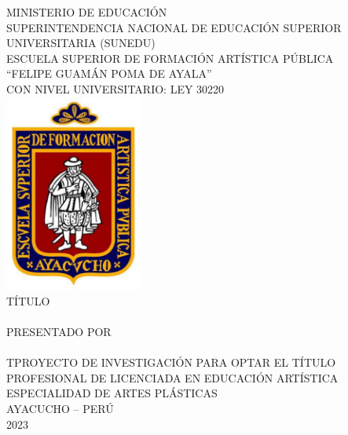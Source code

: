 \documentclass[12pt,a4paper]{article}
\begin{document}
\setlength{\abovecaptionskip}{0pt}
\setlength{\belowcaptionskip}{0pt}
  
\thispagestyle{empty}

{
\normalsize\centering\thispagestyle{empty} MINISTERIO DE EDUCACIÓN{}
\\SUPERINTENDENCIA NACIONAL DE EDUCACIÓN SUPERIOR UNIVERSITARIA (SUNEDU)\\
\vspace{0.65cm}
{
	\large ESCUELA SUPERIOR DE FORMACIÓN ARTÍSTICA PÚBLICA\\``FELIPE GUAMÁN POMA DE AYALA''}\\
{\scriptsize CON NIVEL UNIVERSITARIO: LEY 30220}\\
\vspace{0.65cm}
\includegraphics[height=6.5cm]{logo}\\
\vspace{0.65cm}  {\large TÍTULO}\\
\vspace{0.65cm}
\MakeUppercase{\Large\titulo}\\
\vspace{0.65cm}
{\large PRESENTADO POR\\
	\vspace{0.65cm}
	\autor
}\\
\vspace{0.65cm}
\large TPROYECTO DE INVESTIGACIÓN PARA OPTAR EL TÍTULO PROFESIONAL DE LICENCIADA EN EDUCACIÓN ARTÍSTICA\\
\vspace{0.3cm}  ESPECIALIDAD DE ARTES PLÁSTICAS\\
\vspace{0.3cm}  AYACUCHO -- PERÚ\\
\vfill
{ 2023}

}

\newpage{}
\newpage
\end{document}
